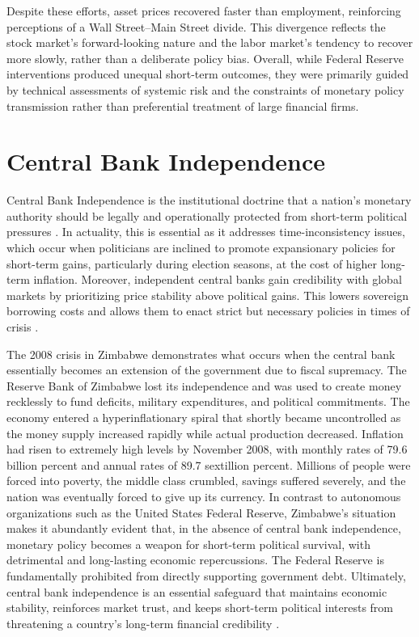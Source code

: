\documentclass[12pt]{article}
\begin{document}
{} Despite these efforts, asset prices recovered faster than employment, reinforcing perceptions of a Wall Street--Main Street divide. This divergence reflects the stock market's forward-looking nature and the labor market's tendency to recover more slowly, rather than a deliberate policy bias. Overall, while Federal Reserve interventions produced unequal short-term outcomes, they were primarily guided by technical assessments of systemic risk and the constraints of monetary policy transmission rather than preferential treatment of large financial firms.

\section{Central Bank Independence}
{} Central Bank Independence is the institutional doctrine that a nation's monetary authority should be legally and operationally protected from short-term political pressures \parencite{Richardson_2025}. In actuality, this is essential as it addresses time-inconsistency issues, which occur when politicians are inclined to promote expansionary policies for short-term gains, particularly during election seasons, at the cost of higher long-term inflation. Moreover, independent central banks gain credibility with global markets by prioritizing price stability above political gains. This lowers sovereign borrowing costs and allows them to enact strict but necessary policies in times of crisis \parencite{Athanasopoulos_2025}. 

{} The 2008 crisis in Zimbabwe demonstrates what occurs when the central bank essentially becomes an extension of the government due to fiscal supremacy. The Reserve Bank of Zimbabwe lost its independence and was used to create money recklessly to fund deficits, military expenditures, and political commitments. The economy entered a hyperinflationary spiral that shortly became uncontrolled as the money supply increased rapidly while actual production decreased. Inflation had risen to extremely high levels by November 2008, with monthly rates of 79.6 billion percent and annual rates of 89.7 sextillion percent. Millions of people were forced into poverty, the middle class crumbled, savings suffered severely, and the nation was eventually forced to give up its currency. In contrast to autonomous organizations such as the United States Federal Reserve, Zimbabwe's situation makes it abundantly evident that, in the absence of central bank independence, monetary policy becomes a weapon for short-term political survival, with detrimental and long-lasting economic repercussions. The Federal Reserve is fundamentally prohibited from directly supporting government debt. Ultimately, central bank independence is an essential safeguard that maintains economic stability, reinforces market trust, and keeps short-term political interests from threatening a country's long-term financial credibility \parencite{Athanasopoulos_2025}.
\end{document}
